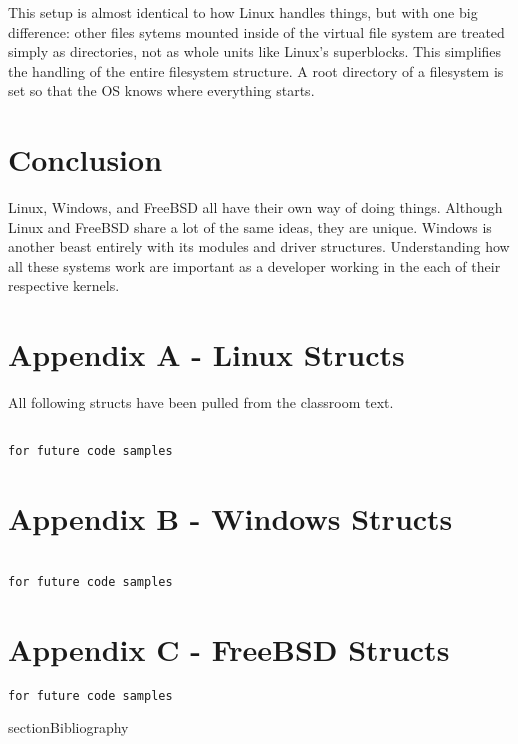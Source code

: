 \documentclass[10pt,letterpaper,onecolumn,draftclsnofoot]{IEEEtran}
\begin{document}
 This setup is almost identical to how Linux handles things, but with one big
 difference: other files sytems mounted inside of the virtual file system are treated simply
 as directories, not as whole units like Linux's superblocks. This simplifies
 the handling of the entire filesystem structure. A root directory of a filesystem
 is set so that the OS knows where everything starts.

 \section{Conclusion}
Linux, Windows, and FreeBSD all have their own way of doing things. Although Linux
and FreeBSD share a lot of the same ideas, they are unique. Windows is another beast
entirely with its modules and driver structures. Understanding how all these systems
work are important as a developer working in the each of their respective kernels.

\clearpage
\section{Appendix A - Linux Structs}
All following structs have been pulled from the classroom text. \cite{robertlove2010}
\begin{lstlisting}

for future code samples

\end{lstlisting}

\section{Appendix B - Windows Structs}
\begin{lstlisting}

for future code samples
\end{lstlisting}
\section{Appendix C - FreeBSD Structs}
\begin{lstlisting}
for future code samples

\end{lstlisting}

section{Bibliography}


\end{document}
